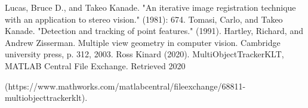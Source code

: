 \documentclass[journal]{IEEEtran}
\begin{document}


%
%
%
\begin{thebibliography}{5}

  Lucas, Bruce D., and Takeo Kanade. "An iterative image registration technique with an application to stereo vision." (1981): 674.
Tomasi, Carlo, and Takeo Kanade. "Detection and tracking of point features." (1991).
Hartley, Richard, and Andrew Zisserman. Multiple view geometry in computer vision. Cambridge university press, p. 312, 2003.
Ross Kinard (2020). MultiObjectTrackerKLT, MATLAB Central File Exchange. Retrieved 2020 

(https://www.mathworks.com/matlabcentral/fileexchange/68811-multiobjecttrackerklt).
\end{thebibliography}

% 

\end{document}
